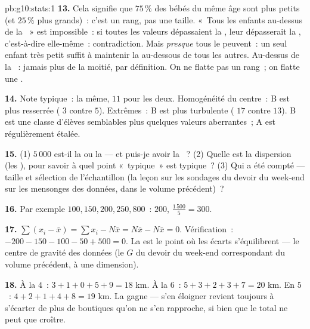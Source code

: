 \begin{solution}{pb:g10:stats:1}
\textbf{13.} Cela signifie que $75\,\%$ des bébés du même âge sont
plus petits (et $25\,\%$ plus grands)~: c'est un rang, pas une
taille. «~Tous les enfants au-dessus de la ~» est
impossible~: si toutes les valeurs dépassaient la , leur
 dépasserait la , c'est-à-dire elle-même~:
contradiction. Mais \emph{presque} tous le peuvent~: un seul enfant
très petit suffit à maintenir la  au-dessous de tous les
autres. Au-dessus de la \emph{}~: jamais plus de la moitié,
par définition. On ne flatte pas un rang~; on flatte une .

\textbf{14.} Note typique~: la même,  $11$ pour les deux.
Homogénéité du centre~: B est plus resserrée ( $3$
contre $5$). Extrêmes~: B est plus turbulente ( $17$ contre
$13$). B est une classe d'élèves semblables plus quelques valeurs
aberrantes~; A est régulièrement étalée.

\textbf{15.} (1) $5\,000$ est-il la  ou la  --- et
puis-je avoir la ~? (2) Quelle est la dispersion (les
), pour savoir à quel point «~typique~» est typique~?
(3) Qui a été compté --- taille et sélection de l'échantillon (la
leçon sur les sondages du devoir du week-end sur les mensonges des
données, dans le volume précédent)~?

\textbf{16.} Par exemple $100, 150, 200, 250, 800$~:  $200$,
 $\frac{1\,500}{5} = 300$.

\textbf{17.} $\sum (x_i - \bar x) = \sum x_i - N \bar x =
N\bar x - N\bar x = 0$. Vérification~:
$-200 - 150 - 100 - 50 + 500 = 0$. La  est le point où les
écarts s'équilibrent --- le centre de gravité des données (le $G$ du
devoir du week-end correspondant du volume précédent, à une
dimension).

\textbf{18.} À la  $4$~: $3 + 1 + 0 + 5 + 9 = 18$ km. À la
 $6$~: $5 + 3 + 2 + 3 + 7 = 20$ km. En $5$~:
$4 + 2 + 1 + 4 + 8 = 19$ km. La  gagne --- s'en éloigner
revient toujours à s'écarter de plus de boutiques qu'on ne s'en
rapproche, si bien que le total ne peut que croître.


\end{solution}
